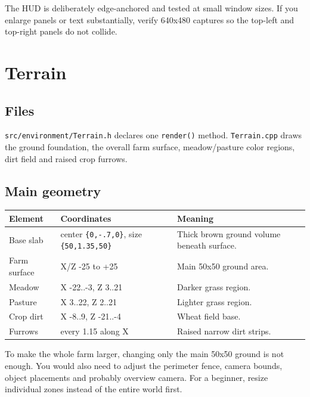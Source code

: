 \documentclass[11pt,a4paper,openany]{book}
\newcommand{\code}[1]{\texttt{#1}}
\newcommand{\file}[1]{\nolinkurl{#1}}
\begin{document}
\begin{warningbox}
	The HUD is deliberately edge-anchored and tested at small window sizes. If you enlarge panels or text substantially, verify 640x480 captures so the top-left and top-right panels do not collide.
\end{warningbox}

\chapter{Terrain}
\section{Files}
\file{src/environment/Terrain.h} declares one \code{render()} method. \file{Terrain.cpp} draws the ground foundation, the overall farm surface, meadow/pasture color regions, dirt field and raised crop furrows.

\section{Main geometry}
\begin{longtable}{@{}p{}p{}p{}@{}}
	\toprule
	Element      & Coordinates                                           & Meaning                                    \\
	\midrule
	\endhead
	Base slab    & center \code{\{0,-.7,0\}}, size \code{\{50,1.35,50\}} & Thick brown ground volume beneath surface. \\
	Farm surface & X/Z -25 to +25                                        & Main 50x50 ground area.                    \\
	Meadow       & X -22..-3, Z 3..21                                    & Darker grass region.                       \\
	Pasture      & X 3..22, Z 2..21                                      & Lighter grass region.                      \\
	Crop dirt    & X -8..9, Z -21..-4                                    & Wheat field base.                          \\
	Furrows      & every 1.15 along X                                    & Raised narrow dirt strips.                 \\
	\bottomrule
\end{longtable}

\begin{editbox}
	To make the whole farm larger, changing only the main 50x50 ground is not enough. You would also need to adjust the perimeter fence, camera bounds, object placements and probably overview camera. For a beginner, resize individual zones instead of the entire world first.
\end{editbox}
\end{document}
